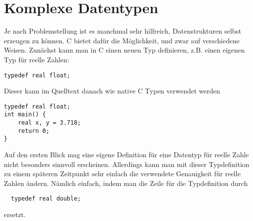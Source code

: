\section{Komplexe Datentypen}

Je nach Problemstellung ist es manchmal sehr hilfreich, Datenstrukturen selbst erzeugen zu können.
C bietet dafür die Möglichkeit, und zwar auf verschiedene Weisen.
Zunächst kann man in C einen neuen Typ definieren, z.B. einen eigenen Typ für reelle Zahlen:
\begin{lstlisting}
typedef real float;
\end{lstlisting}
Dieser kann im Quelltext danach wie native C Typen verwendet werden
\begin{lstlisting}
typedef real float;
int main() {
    real x, y = 3.718;
    return 0;
}
\end{lstlisting}
Auf den ersten Blick mag eine eigene Definition für eine Datentyp für reelle Zahle nicht besonders sinnvoll erscheinen.
Allerdings kann man mit dieser Typdefinition zu einem späteren Zeitpunkt sehr einfach die verwendete Genauigkeit für reelle Zahlen ändern.
Nämlich einfach, indem man die Zeile für die Typdefinition durch
\begin{lstlisting}
  typedef real double;
\end{lstlisting}
ersetzt.

